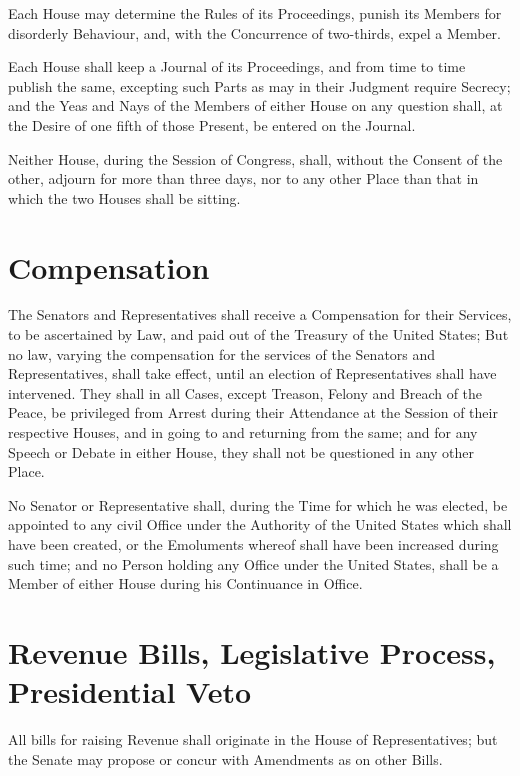 \documentclass{constitution}
\begin{document}
Each House may determine the Rules of its Proceedings,
punish its Members for disorderly Behaviour,
and, with the Concurrence of two-thirds, expel a Member.

Each House shall keep a Journal of its Proceedings,
and from time to time publish the same,
excepting such Parts as may in their Judgment require Secrecy;
and the Yeas and Nays of the Members of either House on any question shall,
at the Desire of one fifth of those Present,
be entered on the Journal.

Neither House, during the Session of Congress, shall, without the Consent of the other,
adjourn for more than three days,
nor to any other Place than that in which the two Houses shall be sitting.

\section{Compensation}
The Senators and Representatives shall receive a Compensation for their Services,
to be ascertained by Law, and paid out of the Treasury of the United States;
But no law, varying the compensation for the services of the Senators and Representatives,
shall take effect, until an election of Representatives shall have intervened.
They shall in all Cases, except Treason, Felony and Breach of the Peace,
be privileged from Arrest during their Attendance at the Session of their respective Houses,
and in going to and returning from the same;
and for any Speech or Debate in either House, they shall not be questioned in any other Place.

No Senator or Representative shall, during the Time for which he was elected,
be appointed to any civil Office under the Authority of the United States
which shall have been created,
or the Emoluments whereof shall have been increased during such time;
and no Person holding any Office under the United States,
shall be a Member of either House during his Continuance in Office.

\section{Revenue Bills, Legislative Process, Presidential Veto}
All bills for raising Revenue shall originate in the House of Representatives;
but the Senate may propose or concur with Amendments as on other Bills.
\end{document}
